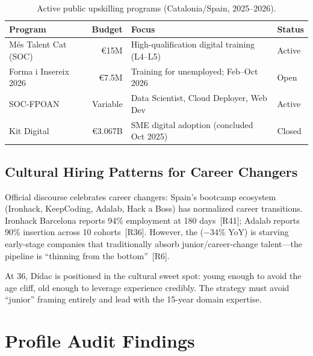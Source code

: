\documentclass[a4paper,11pt,openany]{report}
\begin{document}
\begin{table}[htbp]
\centering
\caption{Active public upskilling programs (Catalonia/Spain, 2025--2026).}
\label{tab:upskilling}
\begin{tabularx}{\textwidth}{l r X l}
\toprule
\textbf{Program} & \textbf{Budget} & \textbf{Focus} & \textbf{Status} \\
\midrule
Més Talent Cat (SOC) & €15M & High-qualification digital training (L4--L5) & Active \\
Forma i Insereix 2026 & €7.5M & Training for unemployed; Feb--Oct 2026 & Open \\
SOC-FPOAN & Variable & Data Scientist, Cloud Deployer, Web Dev & Active \\
Kit Digital & €3.067B & SME digital adoption (concluded Oct 2025) & Closed \\
\bottomrule
\end{tabularx}
\end{table}

\section{Cultural Hiring Patterns for Career Changers}

Official discourse celebrates career changers: Spain's bootcamp ecosystem
(Ironhack, KeepCoding, Adalab, Hack a Boss) has normalized career transitions.
Ironhack Barcelona reports 94\% employment at 180 days~[R41]; Adalab
reports 90\% insertion across 10 cohorts~[R36]. However, the
 ($-$34\% YoY) is starving early-stage companies
that traditionally absorb junior/career-change talent---the pipeline is
``thinning from the bottom''~[R6].

At 36, Dídac is positioned in the cultural sweet spot: young enough to avoid
the age cliff, old enough to leverage experience credibly. The strategy must
avoid ``junior'' framing entirely and lead with the 15-year domain expertise.



\chapter{Profile Audit Findings}
\label{ch:audit}
\end{document}
